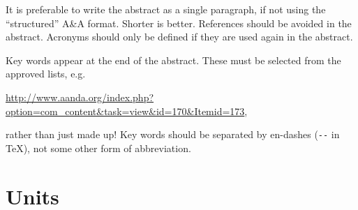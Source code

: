 \documentclass[letterpaper,11pt]{article}
\begin{document}
It is preferable to write the abstract as a single paragraph, if not using the ``structured'' A\&A format.  Shorter is
better.  References should be avoided in the abstract.  Acronyms should only
be defined if they are used again in the abstract.

Key words appear at the end of the abstract.  These must be selected from
the approved lists, e.g.

\url{http://www.aanda.org/index.php?option=com_content\&task=view\&id=170\&Itemid=173},

\noindent
rather than just made up!  Key words should be separated by en-dashes (\verb|--| in
\TeX), not some other form of abbreviation.


\section{Units}
\end{document}
